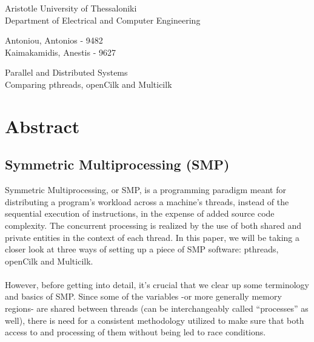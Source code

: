 \documentclass[11pt,a4paper,onecolumn,final]{article}
\begin{document}

\thispagestyle{empty}
{\sffamily\centering\Large

\vspace{\fill}

{\Large Aristotle University of Thessaloniki\\
Department of Electrical and Computer Engineering}\\[0.5cm]


\vspace{2.0cm}

{\LARGE Antoniou, Antonios - 9482\\
Kaimakamidis, Anestis - 9627}

\vspace{3.5cm}

	
{\LARGE Parallel and Distributed Systems}\\[1em]

{\Large Comparing pthreads, openCilk and Multicilk}

\vspace{3.5cm}


}


\newpage

\section{Abstract}
\subsection{Symmetric Multiprocessing (SMP)}
Symmetric Multiprocessing, or SMP, is a programming paradigm meant for distributing a program’s workload across a machine’s threads, instead of the sequential execution of instructions, in the expense of added source code complexity. The concurrent processing is realized by the use of both shared and private entities in the context of each thread. In this paper, we will be taking a closer look at three ways of setting up a piece of SMP software: pthreads, openCilk and Multicilk.\\
\\
However, before getting into detail, it’s crucial that we clear up some terminology and basics of SMP. Since some of the variables -or more generally memory regions- are shared between threads (can be interchangeably called “processes” as well), there is need for a consistent methodology utilized to make sure that both access to and processing of them without being led to race conditions.
\end{document}
